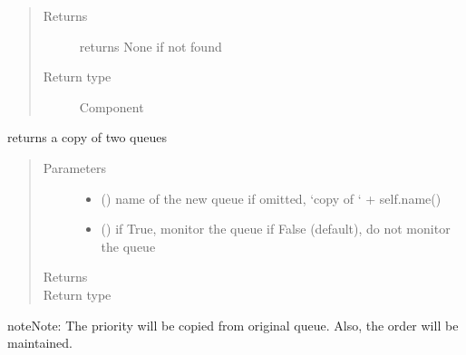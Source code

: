 \documentclass[letterpaper,10pt,english]{sphinxmanual}
\begin{document}
\begin{fulllineitems}
\begin{fulllineitems}
\begin{quote}
\begin{description}
\item[{Returns}] \leavevmode
{} \textendash{} returns None if not found

\item[{Return type}] \leavevmode
Component 

\end{description}\end{quote}

\end{fulllineitems}


\begin{fulllineitems}
\label{\detokenize{Reference:salabim.Queue.copy}}
returns a copy of two queues
\begin{quote}\begin{description}
\item[{Parameters}] \leavevmode\begin{itemize}
\item {} 
 () \textendash{} name of the new queue 
if omitted, ‘copy of ‘ + self.name()

\item {} 
 () \textendash{} if True, monitor the queue 
if False (default), do not monitor the queue

\end{itemize}

\item[{Returns}] \leavevmode
{}

\item[{Return type}] \leavevmode
{\hyperref[\detokenize{Reference:salabim.Queue}]{}}

\end{description}\end{quote}

\begin{sphinxadmonition}{note}{Note:}
The priority will be copied from original queue.
Also, the order will be maintained.
\end{sphinxadmonition}


\end{fulllineitems}
\end{fulllineitems}
\end{document}

